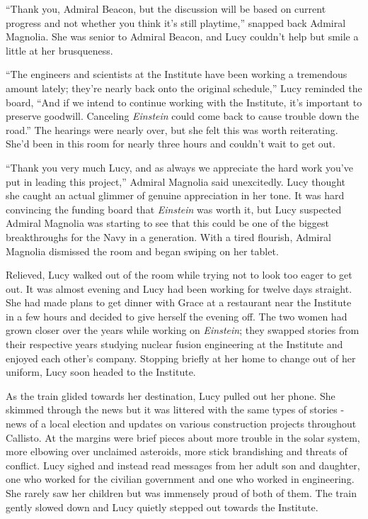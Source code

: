 \documentclass[openany, 12pt]{book} %
\begin{document}
``Thank you, Admiral Beacon, but the discussion will be based on current progress and not whether you think it's still playtime,'' snapped back Admiral Magnolia. She was senior to Admiral Beacon, and Lucy couldn't help but smile a little at her brusqueness.

``The engineers and scientists at the Institute have been working a tremendous amount lately; they're nearly back onto the original schedule,'' Lucy reminded the board, ``And if we intend to continue working with the Institute, it's important to preserve goodwill. Canceling \textit{Einstein} could come back to cause trouble down the road.'' The hearings were nearly over, but she felt this was worth reiterating. She'd been in this room for nearly three hours and couldn't wait to get out.

``Thank you very much Lucy, and as always we appreciate the hard work you've put in leading this project,'' Admiral Magnolia said unexcitedly. Lucy thought she caught an actual glimmer of genuine appreciation in her tone. It was hard convincing the funding board that \textit{Einstein} was worth it, but Lucy suspected Admiral Magnolia was starting to see that this could be one of the biggest breakthroughs for the Navy in a generation. With a tired flourish, Admiral Magnolia dismissed the room and began swiping on her tablet.

Relieved, Lucy walked out of the room while trying not to look too eager to get out. It was almost evening and Lucy had been working for twelve days straight. She had made plans to get dinner with Grace at a restaurant near the Institute in a few hours and decided to give herself the evening off. The two women had grown closer over the years while working on \textit{Einstein}; they swapped stories from their respective years studying nuclear fusion engineering at the Institute and enjoyed each other's company. Stopping briefly at her home to change out of her uniform, Lucy soon headed to the Institute.

As the train glided towards her destination, Lucy pulled out her phone. She skimmed through the news but it was littered with the same types of stories - news of a local election and updates on various construction projects throughout Callisto. At the margins were brief pieces about more trouble in the solar system, more elbowing over unclaimed asteroids, more stick brandishing and threats of conflict. Lucy sighed and instead read messages from her adult son and daughter, one who worked for the civilian government and one who worked in engineering. She rarely saw her children but was immensely proud of both of them. The train gently slowed down and Lucy quietly stepped out towards the Institute.
\end{document}
